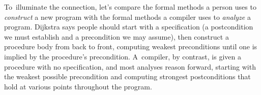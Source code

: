 \documentclass[blockstyle,preprint,natbib,nocopyrightspace]{sigplanconf}
\begin{document}

To~illuminate the connection, let's compare the formal methods a 
person uses to 
\emph{construct} a new program with the formal methods a compiler uses
to \emph{analyze} a program.
Dijkstra says people should start with a specification (a postcondition
we must establish and a precondition we may assume), then construct a
procedure body from back 
to front, computing weakest preconditions until one is implied by the
procedure's precondition. 
A~compiler, by contrast, is given a procedure with no specification,
and most analyses reason forward,  starting with the
weakest possible precondition and 
computing strongest postconditions that hold at various points throughout the program.
\end{document}
